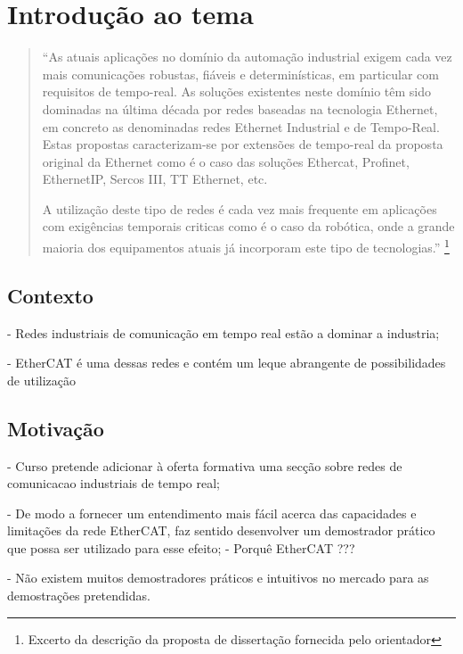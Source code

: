\section{Introdução ao tema}\label{sec:intro}

\begin{quote}
 ``As atuais aplicações no domínio da automação industrial exigem cada vez mais comunicações robustas, fiáveis e determinísticas, 
 em particular com requisitos de tempo-real. As soluções existentes neste domínio têm sido dominadas na última década por redes baseadas na tecnologia Ethernet,
 em concreto as denominadas redes Ethernet Industrial e de Tempo-Real. Estas propostas caracterizam-se por extensões de tempo-real da proposta original da Ethernet 
 como é o caso das soluções Ethercat, Profinet, EthernetIP, Sercos III, TT Ethernet, etc. 
 
A utilização deste tipo de redes é cada vez mais frequente em aplicações com exigências temporais criticas como é o caso da robótica, onde a grande maioria dos equipamentos atuais já incorporam este tipo de tecnologias.''
\footnote{Excerto da descrição da proposta de dissertação fornecida pelo orientador}
\end{quote}

\subsection{Contexto}\label{sec:contexto}

- Redes industriais de comunicação em tempo real estão a dominar a industria;

- EtherCAT é uma dessas redes e contém um leque abrangente de possibilidades de utilização


\subsection{Motivação}\label{sec:motivacao}

- Curso pretende adicionar à oferta formativa uma secção sobre redes de comunicacao industriais de tempo real;

- De modo a fornecer um entendimento mais fácil acerca das capacidades e limitações da rede EtherCAT, faz sentido desenvolver um demostrador prático que possa ser utilizado para esse efeito;
 - Porquê EtherCAT ???

- Não existem muitos demostradores práticos e intuitivos no mercado para as demostrações pretendidas.


